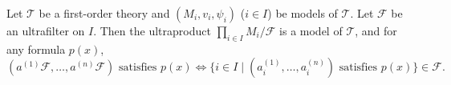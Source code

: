 Let $\mathcal{T}$ be a first-order theory and $(M_i, v_i, \psi_i)$ ($i \in I$) be models of $\mathcal{T}$. Let $\mathcal{F}$ be an ultrafilter on $I$. Then the ultraproduct $\prod_{i \in I} M_i / \mathcal{F}$ is a model of $\mathcal{T}$, and for any formula $p(x)$,
$$(a^{(1)}\mathcal{F}, \ldots, a^{(n)}\mathcal{F}) \text{ satisfies } p(x) \iff \{i \in I \mid (a^{(1)}_i, \ldots, a^{(n)}_i) \text{ satisfies } p(x)\} \in \mathcal{F}.$$
